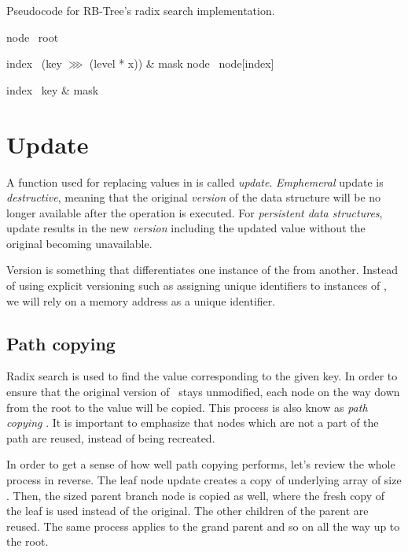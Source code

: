 \begin{listing}[ht!]        
    \caption{Pseudocode for RB-Tree's radix search implementation.}
    \label{lst:rb-tree-radix-search}

    \begin{algorithmic}
            \State node \la\ root

                \State index \la\ (key $\ggg$ (level * x)) \& mask
                \State node \la\ node[index]
            \EndFor

            \State index \la\ key \& mask
            \State {}
        \EndFunction
    \end{algorithmic}
\end{listing}

\section{Update}
A function used for replacing values in \rbtree{} is called \emph{update}. \emph{Emphemeral} update is \emph{destructive}, meaning that the original \emph{version} of the data structure will be no longer available after the operation is executed. For \emph{persistent data structures}, update results in the new \emph{version} including the updated value without the original becoming unavailable. 

Version is something that differentiates one instance of the \rbtree{} from another. Instead of using explicit versioning such as assigning unique identifiers to instances of \rbtree{}, we will rely on a memory address as a unique identifier. 

\subsection*{Path copying}
Radix search is used to find the value corresponding to the given key. In order to ensure that the original version of \rbtree\ stays unmodified, each node on the way down from the root to the value will be copied. This process is also know as \emph{path copying} \cite{planar-point-location}. It is important to emphasize that nodes which are not a part of the path are reused, instead of being recreated. 

In order to get a sense of how well path copying performs, let’s review the whole process in reverse. The leaf node update creates a copy of underlying array of size \m{}. Then, the \m{} sized parent branch node is copied as well, where the fresh copy of the leaf is used instead of the original. The other children of the parent are reused. The same process applies to the grand parent and so on all the way up to the root.  


